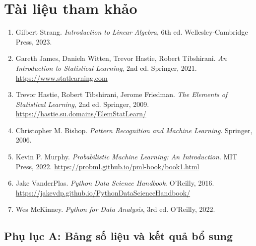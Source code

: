 \documentclass[a4paper]{article}
\begin{document}
\section*{Tài liệu tham khảo}
\begin{enumerate}
    \item Gilbert Strang. \textit{Introduction to Linear Algebra}, 6th ed. Wellesley-Cambridge Press, 2023.
    \item Gareth James, Daniela Witten, Trevor Hastie, Robert Tibshirani. \textit{An Introduction to Statistical Learning}, 2nd ed. Springer, 2021. \url{https://www.statlearning.com}
    \item Trevor Hastie, Robert Tibshirani, Jerome Friedman. \textit{The Elements of Statistical Learning}, 2nd ed. Springer, 2009. \url{https://hastie.su.domains/ElemStatLearn/}
    \item Christopher M. Bishop. \textit{Pattern Recognition and Machine Learning}. Springer, 2006.
    \item Kevin P. Murphy. \textit{Probabilistic Machine Learning: An Introduction}. MIT Press, 2022. \url{https://probml.github.io/pml-book/book1.html}
    \item Jake VanderPlas. \textit{Python Data Science Handbook}. O'Reilly, 2016. \url{https://jakevdp.github.io/PythonDataScienceHandbook/}
    \item Wes McKinney. \textit{Python for Data Analysis}, 3rd ed. O'Reilly, 2022.
\end{enumerate}

\subsection*{Phụ lục A: Bảng số liệu và kết quả bổ sung}
\end{document}
